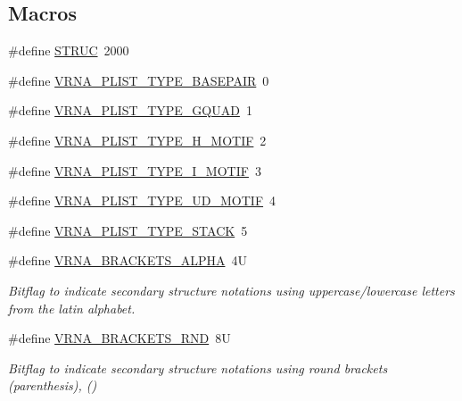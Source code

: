 \subsection*{Macros}
\begin{DoxyCompactItemize}
\item 
\#define \mbox{\hyperlink{group__struct__utils_gaa100f7d3ce0ad4f527a61c5764ebf277}{S\+T\+R\+UC}}~2000
\item 
\#define \mbox{\hyperlink{group__struct__utils_ga7c7484a8a1e6704b1aefaf589f3b27c1}{V\+R\+N\+A\+\_\+\+P\+L\+I\+S\+T\+\_\+\+T\+Y\+P\+E\+\_\+\+B\+A\+S\+E\+P\+A\+IR}}~0
\item 
\#define \mbox{\hyperlink{group__struct__utils_gac91ab79e9feede5347103949ecf04f8a}{V\+R\+N\+A\+\_\+\+P\+L\+I\+S\+T\+\_\+\+T\+Y\+P\+E\+\_\+\+G\+Q\+U\+AD}}~1
\item 
\#define \mbox{\hyperlink{group__struct__utils_ga4d142e0187b8410b61ec2b168ed4513e}{V\+R\+N\+A\+\_\+\+P\+L\+I\+S\+T\+\_\+\+T\+Y\+P\+E\+\_\+\+H\+\_\+\+M\+O\+T\+IF}}~2
\item 
\#define \mbox{\hyperlink{group__struct__utils_gadf5905518079b5495bce3394cd7afb9a}{V\+R\+N\+A\+\_\+\+P\+L\+I\+S\+T\+\_\+\+T\+Y\+P\+E\+\_\+\+I\+\_\+\+M\+O\+T\+IF}}~3
\item 
\#define \mbox{\hyperlink{group__struct__utils_ga01d749cdb675dcdbac1dc5103378c699}{V\+R\+N\+A\+\_\+\+P\+L\+I\+S\+T\+\_\+\+T\+Y\+P\+E\+\_\+\+U\+D\+\_\+\+M\+O\+T\+IF}}~4
\item 
\#define \mbox{\hyperlink{group__struct__utils_ga36df728a95452170ca8684fc224299ea}{V\+R\+N\+A\+\_\+\+P\+L\+I\+S\+T\+\_\+\+T\+Y\+P\+E\+\_\+\+S\+T\+A\+CK}}~5
\item 
\#define \mbox{\hyperlink{group__struct__utils_ga7e3f630af8d69bb0e917145aacf2f96d}{V\+R\+N\+A\+\_\+\+B\+R\+A\+C\+K\+E\+T\+S\+\_\+\+A\+L\+P\+HA}}~4U
\begin{DoxyCompactList}\small\item\em Bitflag to indicate secondary structure notations using uppercase/lowercase letters from the latin alphabet. \end{DoxyCompactList}\item 
\#define \mbox{\hyperlink{group__struct__utils_gac92d5fa7c6625bce2670ece510a24fbd}{V\+R\+N\+A\+\_\+\+B\+R\+A\+C\+K\+E\+T\+S\+\_\+\+R\+ND}}~8U
\begin{DoxyCompactList}\small\item\em Bitflag to indicate secondary structure notations using round brackets (parenthesis), {\ttfamily ()} \end{DoxyCompactList}\item 

\end{DoxyCompactItemize}
